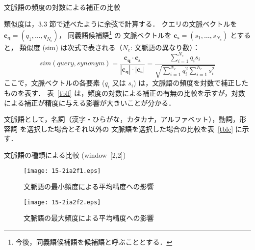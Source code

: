 \documentclass[japanese]{jnlp_1.4}
\begin{document}
\begin{table}[b]
\begin{center}
\caption{文脈語の頻度の対数による補正の比較}
\label{tblf}

\end{center}
\end{table}

類似度は，3.3 節で述べたように余弦で計算する．
クエリの文脈ベクトルを $\boldsymbol{c_{q}}= (q_{1},\ldots , q_{N_{c}})$，
同義語候補語\footnote{
	今後，同義語候補語を候補語と呼ぶこととする．
} の
文脈ベクトルを $\boldsymbol{c_{s}} = (s_{1},\ldots , s_{N_{c}})$ とすると，
類似度 (sim) は次式で表される（$N_{c}$: 文脈語の異なり数）：
\begin{equation}
\mathit{sim}(\mathit{query,synonym}) = \mathbf{\frac{c_{q} \cdot c_{s}}{|c_{q}| \cdot |c_{s}|}}
		= \frac{\sum_{i=1}^{N_{c}} q_{i} s_{i}}{\sqrt{\sum_{i=1}^{N_{c}} q_{i}^2 \sum_{i=1}^{N_{c}} s_{i}^2}}
\end{equation}
ここで，文脈ベクトルの各要素 ($q_{i}$ 又は $s_{i}$) は，文脈語の頻度を対数で補正したものを表す．
表~\ref{tblf} は，頻度の対数による補正の有無の比較を示すが，対数による補正が精度に与える影響が大きいことが分かる．

文脈語として，名詞（漢字・ひらがな，カタカナ，アルファベット），動詞，形容詞
を選択した場合とそれ以外の
文脈語を選択した場合の比較を表~\ref{tblc} に示す．

\begin{table}[t]
\begin{center}
\caption{文脈語の種類による比較 (window~[2,2])}
\label{tblc}

\end{center}
\end{table}
\begin{figure} [t]
\begin{minipage}{0.48\textwidth}
\begin{center}
\texttt{[image: 15-2ia2f1.eps]}
\caption{文脈語の最小頻度による平均精度への影響}
\label{fig:minfreq}
\end{center}
\end{minipage}
\hfill
\begin{minipage}{0.48\textwidth}
\begin{center}
\texttt{[image: 15-2ia2f2.eps]}
\caption{文脈語の最大頻度による平均精度への影響}
\label{fig:maxfreq}
\end{center}
\end{minipage}
\end{figure}
\end{document}

